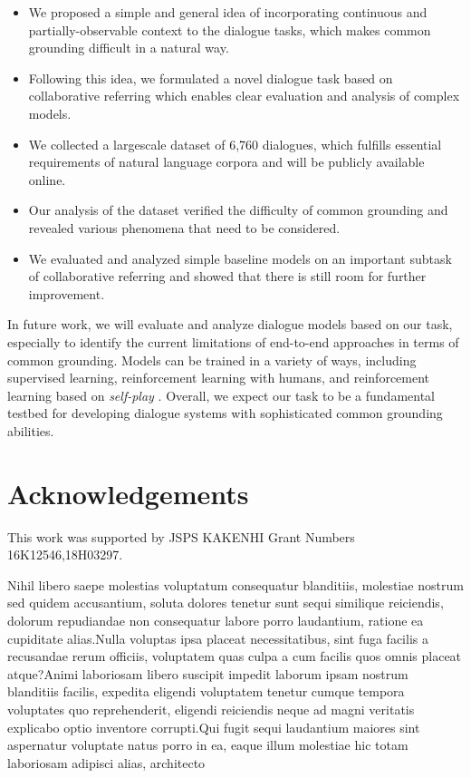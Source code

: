 \documentclass[letterpaper]{article}
\begin{document}
\begin{itemize}
\item We proposed a simple and general idea of incorporating continuous and partially-observable context to the dialogue tasks, which makes common grounding difficult in a natural way.
\item Following this idea, we formulated a novel dialogue task based on collaborative referring which enables clear evaluation and analysis of complex models.
\item We collected a largescale dataset of 6,760 dialogues, which fulfills essential requirements of natural language corpora and will be publicly available online.
\item Our analysis of the dataset verified the difficulty of common grounding and revealed various phenomena that need to be considered.
\item We evaluated and analyzed simple baseline models on an important subtask of collaborative referring and showed that there is still room for further improvement.
\end{itemize}

In future work, we will evaluate and analyze dialogue models based on our task, especially to identify the current limitations of end-to-end approaches in terms of common grounding. Models can be trained in a variety of ways, including supervised learning, reinforcement learning with humans, and reinforcement learning based on \emph{self-play} \cite{lewis2017deal}. Overall, we expect our task to be a fundamental testbed for developing dialogue systems with sophisticated common grounding abilities.

\section*{Acknowledgements}
This work was supported by JSPS KAKENHI Grant Numbers 16K12546,18H03297.

\fontsize{9.5pt}{10.5pt} \selectfont

Nihil libero saepe molestias voluptatum consequatur blanditiis, molestiae nostrum sed quidem accusantium, soluta dolores tenetur sunt sequi similique reiciendis, dolorum repudiandae non consequatur labore porro laudantium, ratione ea cupiditate alias.Nulla voluptas ipsa placeat necessitatibus, sint fuga facilis a recusandae rerum officiis, voluptatem quas culpa a cum facilis quos omnis placeat atque?Animi laboriosam libero suscipit impedit laborum ipsam nostrum blanditiis facilis, expedita eligendi voluptatem tenetur cumque tempora voluptates quo reprehenderit, eligendi reiciendis neque ad magni veritatis explicabo optio inventore corrupti.Qui fugit sequi laudantium maiores sint aspernatur voluptate natus porro in ea, eaque illum molestiae hic totam laboriosam adipisci alias, architecto


\end{document}
